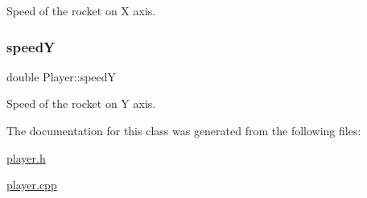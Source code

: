 Speed of the rocket on X axis. 

\mbox{\label{classPlayer_abf2d9f3b437bda111c089c01e4b03017}} 
\subsubsection{\texorpdfstring{speedY}{speedY}}
{\footnotesize\ttfamily double Player\+::speedY}



Speed of the rocket on Y axis. 



The documentation for this class was generated from the following files\+:\begin{DoxyCompactItemize}
\item 
\hyperlink{player_8h}{player.\+h}\item 
\hyperlink{player_8cpp}{player.\+cpp}\end{DoxyCompactItemize}
